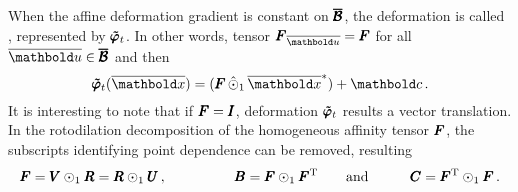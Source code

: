 \noindent When the affine deformation gradient is constant on $\pmb{\overline{\mathcal{B}}}$, the deformation is called , represented by $\pmb{\tilde{\varphi}}_t$. In other words, tensor $\tnr{F}_{\overline{\vto{u}}}=\tnr{F}$ for all $\overline{\vto{u}}\in\tnr{\overline{\mathcal{B}}}$ and then 
\begin{equation}\label{eq:homogDef}
\fua{\tnr{\tilde{\varphi}}_t}{\overline{\vto{x}}} =(\tnr{F}\,\hat{\odot}_1\,\overline{\vto{x}}^*) + \vto{c}\,.
\end{equation}
It is interesting to note that if $\pmb{F}=\pmb{I}$, deformation $\pmb{\tilde{\varphi}}_t$ results a vector translation. In the rotodilation decomposition of the homogeneous affinity tensor $\pmb{F}$, the subscripts identifying point dependence can be removed, resulting  
\begin{alignat}{3}
\pmb{F}=\pmb{V}\odot_1\pmb{R}=\pmb{R}\odot_1\pmb{U}\,,&\qquad \qquad &\pmb{B}=\pmb{F}\odot_1\pmb{F}^\text{T}&\qquad \text{and}\qquad & \pmb{C}=\pmb{F}^\text{T}\odot_1\pmb{F}\,.
\end{alignat}

